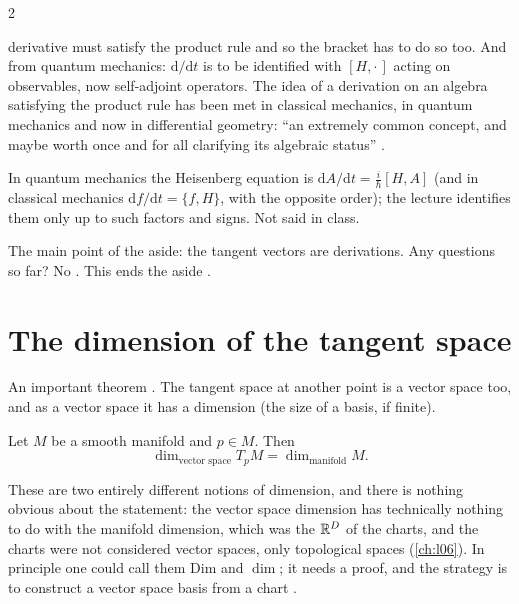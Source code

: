 \begin{paracol}{2}
\begin{remark}
derivative must satisfy the product rule and so the bracket has to do so too. And from quantum mechanics: $\mathrm d/\mathrm dt$ is to be identified with $[H,\cdot\,]$ acting on observables, now self-adjoint operators. The idea of a derivation on an algebra satisfying the product rule has been met in classical mechanics, in quantum mechanics and now
in differential geometry: ``an extremely common concept, and maybe worth once and for all clarifying its algebraic status''      .
\end{remark}
\begin{coursenote}
In quantum mechanics the Heisenberg equation is $\mathrm dA/\mathrm dt=\tfrac{i}{\hbar}[H,A]$ (and in classical mechanics $\mathrm df/\mathrm dt=\{f,H\}$, with the opposite order); the lecture identifies them only up to such factors and signs. Not said in class.
\end{coursenote}
The main point of the aside: the tangent vectors are derivations. Any questions so far? No  . This ends the aside .

\section{The dimension of the tangent space}\label{sec:tv-dim}

An important theorem . The tangent space at another point is a vector space too, and as a vector space it has a dimension (the size of a basis, if finite).

\begin{theorem}\label{thm:tv-dim}
Let $M$ be a smooth manifold and $p\in M$. Then
\[
  \dim_{\text{vector space}}T_pM=\dim_{\text{manifold}}M.
\]
  
\end{theorem}
These are two entirely different notions of dimension, and there is nothing obvious about the statement: the vector space dimension has technically nothing to do with the manifold dimension, which was the $\mathbb{R}^D$ of the charts, and the charts were not considered vector spaces, only topological spaces (\cref{ch:l06}). In principle
one could call them $\mathrm{Dim}$ and $\dim$; it needs a proof, and the strategy is to construct a vector space basis from a chart   .


\end{paracol}
